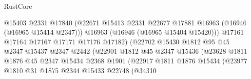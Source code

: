 \begin{lexlean}{RustCore}
\begin{coremodule}
                                          @15403
                                          @2331
                                          @17840
                                          (@22671
                                            @15413
                                            @2331
                                            @22677
                                            @17881
                                            @16963
                                            (@16946 (@16965 @15414 @2347)))
                                          @16963
                                          (@16946 (@16965 @15404 @15420)))
                                        @17161
                                        @17164
                                        @17167
                                        @17171
                                        @17176
                                        @17182)
                                      (@22702
                                        @15430
                                        @1812
                                        @95
                                        @45
                                        @2347
                                        @15437
                                        @2347
                                        @2442
                                        (@22901
                                          @1812
                                          @45
                                          @2347
                                          @15436
                                          (@23628
                                            @1811
                                            @1876
                                            @45
                                            @2347
                                            @15434
                                            @2368
                                            @1901
                                            (@22917
                                              @1811
                                              @1876
                                              @15434
                                              (@23977
                                                @1810
                                                @31
                                                @1875
                                                @2344
                                                @15433
                                                @22748
                                                (@34310

\end{coremodule}
\end{lexlean}
